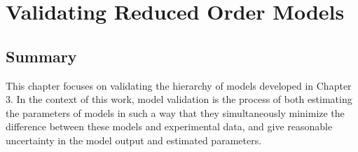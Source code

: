 \chapter{Validating Reduced Order Models}

\ifpdf
    \graphicspath{{Chapter4/Figs/Raster/}{Chapter4/Figs/PDF/}{Chapter4/Figs/}}
\else
    \graphicspath{{Chapter4/Figs/Vector/}{Chapter4/Figs/}}
\fi

\section{Summary}
This chapter focuses on validating the hierarchy of models developed in Chapter 3. In the context of this work, model validation is the process of both estimating the parameters of models in such a way that they simultaneously minimize the difference between these models and experimental data, and give reasonable uncertainty in the model output and estimated parameters.

